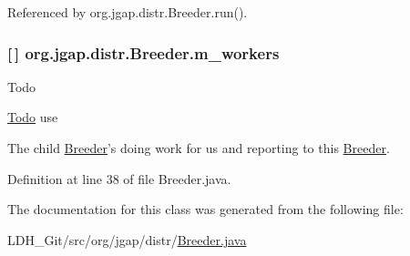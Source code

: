 Referenced by org.\-jgap.\-distr.\-Breeder.\-run().

\hypertarget{classorg_1_1jgap_1_1distr_1_1_breeder_a336a3b9df78c37790c4742f7c4eeb456}{
\subsubsection[{m\-\_\-workers}]{ \mbox{[}$\,$\mbox{]} org.\-jgap.\-distr.\-Breeder.\-m\-\_\-workers\hspace{0.3cm}{\ttfamily [private]}}}\label{classorg_1_1jgap_1_1distr_1_1_breeder_a336a3b9df78c37790c4742f7c4eeb456}
\begin{DoxyRefDesc}{Todo}
\item[\hyperlink{todo__todo000056}{Todo}]use \end{DoxyRefDesc}
The child \hyperlink{classorg_1_1jgap_1_1distr_1_1_breeder}{Breeder}'s doing work for us and reporting to this \hyperlink{classorg_1_1jgap_1_1distr_1_1_breeder}{Breeder}. 

Definition at line 38 of file Breeder.\-java.



The documentation for this class was generated from the following file\-:\begin{DoxyCompactItemize}
\item 
L\-D\-H\-\_\-\-Git/src/org/jgap/distr/\hyperlink{_breeder_8java}{Breeder.\-java}\end{DoxyCompactItemize}
